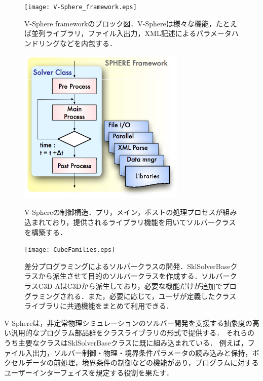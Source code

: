 \begin{figure}[htbp]
\begin{center}
\texttt{[image: V-Sphere\_framework.eps]}
\end{center}
\caption{V-Sphere frameworkのブロック図．V-Sphereは様々な機能，たとえば並列ライブラリ，ファイル入出力，XML記述によるパラメータハンドリングなどを内包する．}
\label{fig:V-Sphere_framework}
\end{figure}

\begin{figure}[htbp]
  \begin{minipage}{.47\textwidth}
  	\begin{center}
  	\includegraphics[width=8cm,clip]{Sphere_Control.eps}
  	\end{center}
  	\caption{V-Sphereの制御構造．プリ，メイン，ポストの処理プロセスが組み込まれており，提供されるライブラリ機能を用いてソルバークラスを構築する．}
	\label{fig:Control_structure}
  \end{minipage} \hfill
  \begin{minipage}{.47\textwidth}
	\begin{center}
  	\texttt{[image: CubeFamilies.eps]}
  	\end{center}
  	\caption{差分プログラミングによるソルバークラスの開発．SklSolverBaseクラスから派生させて目的のソルバークラスを作成する．ソルバークラスC3D-AはC3Dから派生しており，必要な機能だけが追加でプログラミングされる．また，必要に応じて，ユーザが定義したクラスライブラリに共通機能をまとめて利用できる．}
  	\label{fig:DerivedSolvers}
  \end{minipage}
  \vspace*{2mm}
\end{figure}

V-Sphereは，非定常物理シミュレーションのソルバー開発を支援する抽象度の高い汎用的なプログラム部品群をクラスライブラリの形式で提供する．
それらのうち主要なクラスはSklSolverBaseクラスに既に組み込まれている．
例えば，ファイル入出力，ソルバー制御・物理・境界条件パラメータの読み込みと保持，ボクセルデータの前処理，境界条件の制御などの機能があり，プログラムに対するユーザーインターフェイスを規定する役割を果たす．

